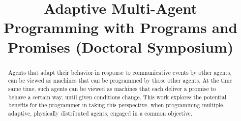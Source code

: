 \documentclass[conference]{IEEEtran}
\begin{document}
\title{Adaptive Multi-Agent Programming with Programs and Promises
(Doctoral Symposium)}

\author{
}

\maketitle

\begin{abstract}


Agents that adapt their behavior in response to communicative events
by other agents, can be viewed as machines that can be programmed by
those other agents. At the time same time, such agents can be viewed
as machines that each deliver a promise to behave a certain way, until
given conditions change. This work explores the potential benefits for
the programmer in taking this perspective, when programming multiple,
adaptive, physically distributed agents, engaged in a common
objective.

\end{abstract}
\end{document}
